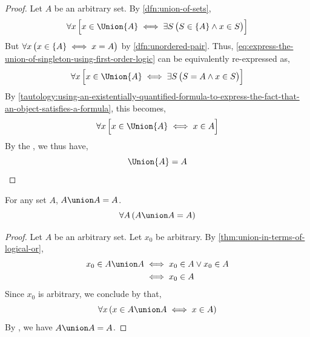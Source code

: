 \begin{proof}
    Let \( A \) be an arbitrary set. By \cref{dfn:union-of-sets},
    \begin{equation}
        \label{eq:express-the-union-of-singleton-using-first-order-logic}
        \forall x \, \Big[ x \in \Union \mleft\{ A \mright\}
        \iff
        \exists S \, \big( S \in \mleft\{ A \mright\} \land x \in S \big) \Big]
    \end{equation}
    But \( \forall x \, \big( x \in \mleft\{ A \mright\} \iff x = A \big) \) by \cref{dfn:unordered-pair}.
    Thus, \eqref{eq:express-the-union-of-singleton-using-first-order-logic} can be equivalently re-expressed as,
    \begin{equation*}
        \forall x \, \Big[ x \in \Union \mleft\{ A \mright\}
        \iff
        \exists S \, \big( S = A \land x \in S \big)
        \Big]
    \end{equation*}
    By \cref{tautology:using-an-existentially-quantified-formula-to-express-the-fact-that-an-object-satisfies-a-formula},
    this becomes,
    \begin{equation*}
        \forall x \, \Big[ x \in \Union \mleft\{ A \mright\}
        \iff
        x \in A \Big]
    \end{equation*}
    By the , we thus have,
    \begin{equation*}
        \Union \mleft\{ A \mright\} = A \qedhere
    \end{equation*}
\end{proof}

\begin{thm}[Idempotence]
    \label{set-identities:idempotence-of-unions}
    For any set \( A \), \( A \union A = A\).
    \begin{equation*}
        \forall A \, \mleft( A \union A = A \mright)
    \end{equation*}
\end{thm}

\begin{proof}
    Let \( A \) be an arbitrary set. Let \( x_{0} \) be arbitrary. By \cref{thm:union-in-terms-of-logical-or},
    \begin{align*}
        x_{0} \in A \union A &\iff x_{0} \in A \lor x_{0} \in A\\
        &\iff x_{0} \in A
    \end{align*}
    Since \( x_{0} \) is arbitrary, we conclude by  that,
    \begin{equation*}
        \forall x \, \mleft( x \in A \union A \iff x \in A \mright)
    \end{equation*}
    By , we have \( A \union A = A \).
\end{proof}

